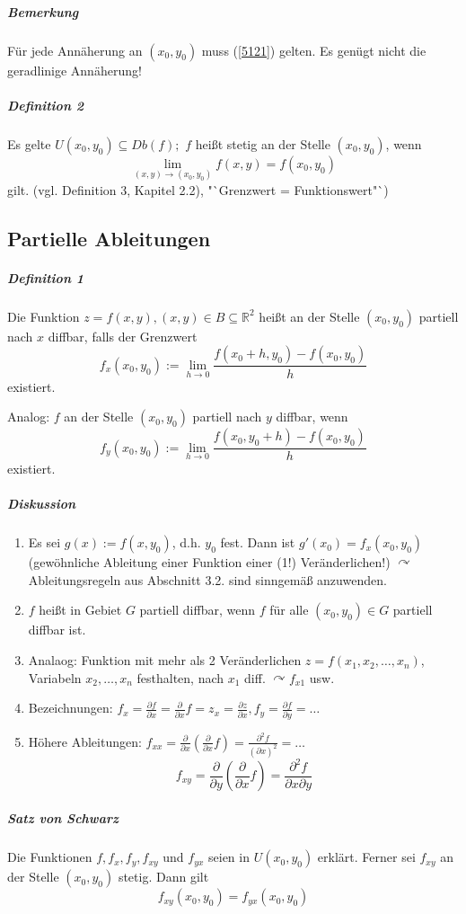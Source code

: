 \documentclass[a4paper]{scrartcl}
\begin{document}
\subparagraph{Bemerkung} Für jede Annäherung an $(x_0,y_0)$ muss (\ref{5121}) gelten. Es genügt nicht die geradlinige Annäherung!

\subparagraph{Definition 2} Es gelte $U(x_0,y_0)  \subseteq Db(f);$ $f$ heißt stetig an der Stelle $(x_0,y_0)$, wenn \[\lim\limits_{(x,y) \to (x_0,y_0)} f(x,y) = f(x_0,y_0)\] gilt. (vgl. Definition 3, Kapitel 2.2), "`Grenzwert = Funktionswert"`)

\subsection{Partielle Ableitungen}
\subparagraph{Definition 1} Die Funktion $z=f(x,y),(x,y) \in B \subseteq \mathbb{R}^2$ heißt an der Stelle $(x_0,y_0)$ partiell nach $x$ diffbar, falls der Grenzwert
\[f_x(x_0,y_0) := \lim\limits_{h \to 0} \frac{f(x_0+h,y_0) -f(x_0,y_0)}{h}\]
existiert.

Analog: $f$ an der Stelle $(x_0,y_0)$ partiell nach $y$ diffbar, wenn
\[f_y(x_0,y_0) := \lim\limits_{h \to 0} \frac{f(x_0,y_0+h) -f(x_0,y_0)}{h}\]
existiert.

\subparagraph{Diskussion}
\begin{enumerate}
\item Es sei $g(x) := f(x,y_0)$, d.h. $y_0$ fest. Dann ist $g' (x_0) =f_x (x_0,y_0)$ (gewöhnliche Ableitung einer Funktion einer (1!) Veränderlichen!) $\curvearrowright$ Ableitungsregeln aus Abschnitt 3.2. sind sinngemäß anzuwenden.
\item $f$ heißt in Gebiet $G$ partiell diffbar, wenn $f$ für alle $(x_0,y_0) \in G$ partiell diffbar ist.
\item Analaog: Funktion mit mehr als 2 Veränderlichen $z=f(x_1,x_2,\dots,x_n)$, Variabeln $x_2,\dots,x_n$ festhalten, nach $x_1$ diff. $\curvearrowright f_{x1}$ usw.
\item Bezeichnungen: $f_x = \frac{\partial f}{\partial x} =  \frac{\partial}{\partial x} f = z_x = \frac{\partial z}{\partial x}, f_y = \frac{\partial f}{\partial y} = \dots$
\item Höhere Ableitungen: $f_{xx} = \frac{\partial}{\partial x} (\frac{\partial}{\partial x} f) = \frac{\partial^2 f}{(\partial x)^2} = \dots$\\
\[ f_{xy} = \frac{\partial}{\partial y} (\frac{\partial}{\partial x} f) = \frac{\partial^2 f}{\partial x \partial y}\]
\end{enumerate}

\subparagraph{Satz von Schwarz} Die Funktionen $f,f_x,f_y,f_{xy}$ und $f_{yx}$ seien in $U(x_0,y_0)$ erklärt. Ferner sei $f_{xy}$ an der Stelle $(x_0,y_0)$ stetig. Dann gilt
\[ f_{xy} (x_0,y_0) = f_{yx} (x_0,y_0)\]
\end{document}
